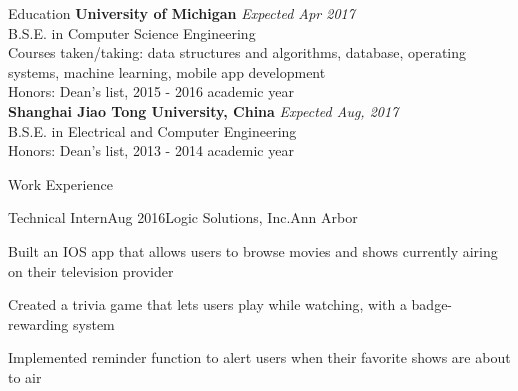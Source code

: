 \documentclass{resume} %
\begin{document}

\begin{rSection}{Education}
{\bf University of Michigan} \hfill {\em Expected Apr 2017} \\ 
B.S.E. in Computer Science Engineering\\
Courses taken/taking: data structures and algorithms, database, operating systems, machine learning, mobile app development\\
Honors: Dean's list, 2015 - 2016 academic year\\
{\bf Shanghai Jiao Tong University, China} \hfill {\em Expected Aug, 2017} \\ 
B.S.E. in Electrical and Computer Engineering \\
Honors: Dean's list, 2013 - 2014 academic year

\end{rSection}

\begin{rSection}{Work Experience}
	\begin{rSubsection}{Technical Intern}{Aug 2016}{Logic Solutions, Inc.}{Ann Arbor}
	\item Built an IOS app that allows users to browse movies and shows currently airing on their television provider
	\item Created a trivia game that lets users play while watching, with a badge-rewarding system
	\item Implemented reminder function to alert users when their favorite shows are about to air
	\end{rSubsection}
\end{rSection}
\end{document}
